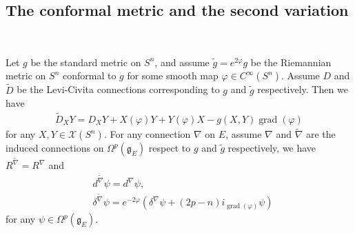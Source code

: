 \documentclass{amsart}
\begin{document}
	\subsection{The conformal metric and the second variation}\ 
	
	Let $g$ be the standard metric on $S^n$, and assume $\tilde g=e^{2\varphi}g$ be the Riemannian metric on $S^n$ conformal to $g$ for some smooth map $\varphi\in C^\infty(S^n)$. Assume $D$ and $\tilde D$ be the Levi-Civita connections corresponding to $g$ and $\tilde g$ respectively. Then we have
	\begin{align*}
		\tilde D_XY=D_XY+X(\varphi)Y+Y(\varphi)X-g(X,Y)\operatorname{grad}(\varphi)
	\end{align*}
	for any $X,Y\in\mathscr{X}(S^n)$. For any connection $\nabla$ on $E$, assume $\nabla$ and $\widetilde\nabla$ are the induced connections on $\Omega^p(\mathfrak{g}_E)$ respect to $g$ and $\tilde g$ respectively, we have $R^{\tilde\nabla}=R^\nabla$ and
	\begin{align*}
		&d^{\tilde\nabla}\psi=d^\nabla\psi,\\
		&\delta^{\tilde\nabla}\psi=e^{-2\varphi}(\delta^\nabla\psi+(2p-n)i_{\operatorname{grad}(\varphi)}\psi)
	\end{align*}
	for any $\psi\in\Omega^p(\mathfrak{g}_E)$.
	
\end{document}
